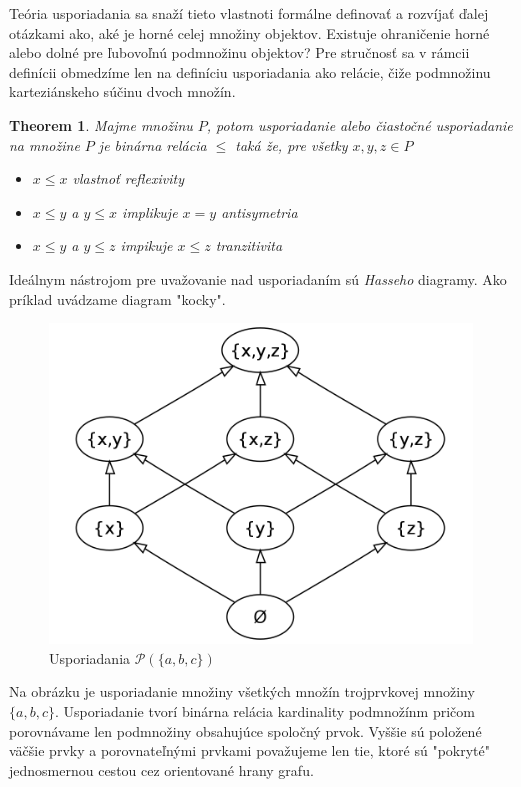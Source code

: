 \documentclass[a4paper,10pt,oneside]{report}%
\newtheorem{theorem}{Theorem}
\begin{document}
Teória usporiadania sa snaží tieto vlastnoti formálne definovať a rozvíjať ďalej
otázkami ako, aké je horné celej množiny objektov. Existuje ohraničenie horné alebo
dolné pre ľubovoľnú podmnožinu objektov?
    Pre stručnosť sa v rámcii definícii obmedzíme len na definíciu usporiadania
ako relácie, čiže podmnožinu karteziánskeho súčinu dvoch množín.

\begin{theorem}
    Majme množinu $P$, potom usporiadanie alebo čiastočné usporiadanie na množine
    $P$ je binárna relácia $\leq$ taká že, pre všetky $x,y,z \in P$
    \begin{itemize}
        \item $x \leq x$ vlastnoť reflexivity
        \item $x \leq y$ a $y \leq x$ implikuje $x = y$ antisymetria
        \item $x \leq y$ a $y \leq z$ impikuje $x \leq z$ tranzitivita
    \end{itemize}
\end{theorem}

    Ideálnym nástrojom pre uvažovanie nad usporiadaním sú \emph{Hasseho} diagramy.
    Ako príklad uvádzame diagram "kocky".

\begin{figure}[!ht]
    \centering
    \includegraphics[scale=0.15]{cube.png}
    \caption{Usporiadania $\mathcal{P}(\{a,b,c\})$}
\end{figure}

    Na obrázku je usporiadanie množiny všetkých množín trojprvkovej množiny $\{ a,b,c \}$.
    Usporiadanie tvorí binárna relácia kardinality podmnožínm pričom porovnávame
len podmnožiny obsahujúce spoločný prvok.
    Vyššie sú položené väčšie prvky a porovnateľnými prvkami považujeme len tie,
ktoré sú "pokryté" jednosmernou cestou cez orientované hrany grafu.
\end{document}
